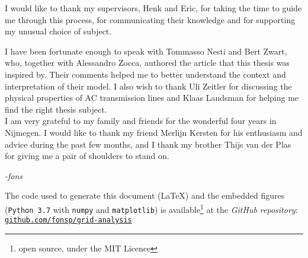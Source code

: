 \documentclass{report}
\theoremstyle{definition}
\theoremstyle{remark}
\begin{document}
I would like to thank my supervisors, Henk and Eric, for taking the time to guide me through this process, for communicating their knowledge and for supporting my unusual choice of subject.

I have been fortunate enough to speak with Tommasso Nesti and Bert Zwart, who, together with Alessandro Zocca, authored the article that this thesis was inspired by. Their comments helped me to better understand the context and interpretation of their model. 
I also wish to thank Uli Zeitler for discussing the physical properties of AC transmission lines and Klaas Landsman for helping me find the right thesis subject.
\\[2em]
I am very grateful to my family and friends for the wonderful four years in {Nijmegen}. I would like to thank my friend Merlijn Kersten for his enthusiasm and advice during the past few months, and I thank my brother Thijs van der Plas for giving me a pair of shoulders to stand on.
\\[3em]
\begin{flushright}
\emph{-fons}
\end{flushright}


%


\vspace{8em}
{The code used to generate this document (\LaTeX) and the embedded figures (\texttt{Python 3.7} with \texttt{numpy} and \texttt{matplotlib}) is available\footnote{open source, under the MIT Licence} at the \emph{GitHub repository}:}\\[1em]
\hphantom{asdfsdzz}\href{https://github.com/fonsp/grid-analysis}{\texttt{github.com/fonsp/grid-analysis}}\\[2em]
\end{document}
